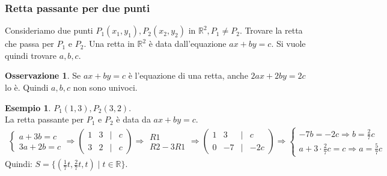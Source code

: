 \documentclass[a4paper]{article}
\theoremstyle{definition}
\newtheorem*{oss}{Osservazione}
\newtheorem*{es}{Esempio}
\begin{document}
	\subsubsection{Retta passante per due punti}
	Consideriamo due punti $P_1(x_1, y_1), P_2(x_2, y_2)$ in $\mathbb{R}^2, P_1 \ne P_2$. Trovare la retta che passa per $P_1$ e $P_2$.
	Una retta in $\mathbb{R}^2$ è data dall'equazione $ax + by = c$. Si vuole quindi trovare $a, b, c$.
	\begin{oss}
		Se $ax + by = c$ è l'equazione di una retta, anche $2ax + 2by = 2c$ lo è. Quindi $a, b, c$ non sono univoci.
	\end{oss}
	\begin{es}
		$P_1(1, 3), P_2(3, 2)$. \\
		La retta passante per $P_1$ e $P_2$ è data da $ax + by = c$.
		\begin{align*}
			\begin{cases}
				a + 3b = c \\
				3a + 2b = c
			\end{cases} \Rightarrow \begin{pmatrix}
				1 & 3 & \mid & c \\
				3 & 2 & \mid & c
			\end{pmatrix} \Rightarrow \begin{matrix}
				R1 \\
				R2 - 3R1
			\end{matrix} \Rightarrow \begin{pmatrix}
				1 & 3 & \mid & c \\
				0 & -7 & \mid & -2c
			\end{pmatrix} \Rightarrow \begin{cases}
				-7b = -2c \Rightarrow b = \frac{2}{7}c \\
				a + 3 \cdot \frac{2}{7}c = c \Rightarrow a = \frac{5}{7}c
			\end{cases}
		\end{align*}
		Quindi: $S = \{(\frac{1}{7}t, \frac{2}{7}t, t) \mid t \in \mathbb{R}\}$.
	\end{es}
\end{document}
